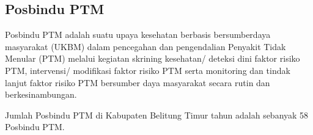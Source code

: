 \subsection{Posbindu PTM}
Posbindu PTM adalah suatu upaya kesehatan berbasis bersumberdaya masyarakat (UKBM) dalam pencegahan dan pengendalian Penyakit Tidak Menular (PTM) melalui kegiatan skrining kesehatan/ deteksi dini faktor risiko PTM, intervensi/ modifikasi faktor risiko PTM serta monitoring dan tindak lanjut faktor risiko PTM bersumber daya masyarakat secara rutin dan berkesinambungan.

Jumlah Posbindu PTM di Kabupaten Belitung Timur tahun \tP adalah sebanyak 58 Posbindu PTM. %
